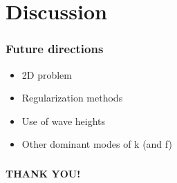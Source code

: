 \documentclass[7pt]{beamer}
\begin{document}


\section{Discussion}
\begin{frame}
 \frametitle{Future directions}
 \begin{itemize}
 \item 2D problem
 \item Regularization methods
 \item Use of wave heights
 \item Other dominant modes of k (and f)
 \end{itemize}

\end{frame}
\begin{frame}
\frametitle{}
\hspace{2.5cm}
\begin{minipage}{50mm}   
                                                                                                                           
      \begin{alertblock}{}    
                                          
            \begin{center}
                                                                                                                                                                                  
                  \textbf{THANK YOU!}
                            
                                                                       
            \end{center}
      \end{alertblock}
\end{minipage}
\end{frame}
\end{document}
